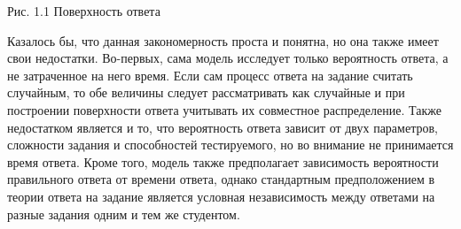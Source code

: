 \documentclass[14pt, a4paper]{extarticle}
\numberwithin{equation}{section}
\begin{document}
{\begin{center}
\begin{figure}[h]
\end{figure}
Рис. 1.1 Поверхность ответа
\end{center}

	Казалось бы, что данная закономерность проста и понятна, но она также имеет свои недостатки. Во-первых, сама модель исследует только вероятность ответа, а не затраченное на него время. Если сам процесс ответа на задание считать случайным, то обе величины следует рассматривать как случайные и при построении поверхности ответа учитывать их совместное распределение. Также недостатком является и то, что вероятность ответа зависит от двух параметров, сложности задания и способностей тестируемого, но во внимание не принимается время ответа. Кроме того, модель также предполагает зависимость вероятности правильного ответа от времени ответа, однако стандартным предположением в теории ответа на задание является условная независимость между ответами на разные задания одним и тем же студентом.

}
\end{document}
